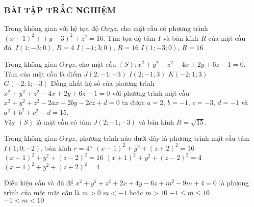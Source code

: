 \subsubsection{BÀI TẬP TRẮC NGHIỆM}
\begin{ex}%
	Trong không gian với hệ tọa độ $Oxyz$, cho mặt cầu có phương trình $(x+1)^2+(y-3)^2+z^2=16$. Tìm tọa độ tâm $I$ và bán kính $R$ của mặt cầu đó.
	{$I(1;-3;0)$, $R=4$}
	{$I(-1;3;0)$, $R=16$}
	{$I(1;-3;0)$, $R=16$}
\end{ex}
\begin{ex}%
	Trong không gian $Oxyz$, cho mặt cầu $(S)\colon x^2+y^2+z^2 -4x+2y+6z-1=0$. Tâm của mặt cầu là điểm
	\choice
	{\True $J(2;-1;-3)$}
	{$I(2;-1;3)$}
	{$K(-2;1;3)$}
	{$G(-2;1;-3)$}
	\loigiai
	{
		Đồng nhất hệ số của phương trình $x^2+y^2+z^2 -4x+2y+6z-1=0$ với phương trình mặt cầu $x^2+y^2+z^2 -2ax-2by-2cz+d=0$ ta được $a=2$, $b=-1$, $c=-3$, $d=-1$ và $a^2+b^2+c^2-d=15$.\\
		Vậy $(S)$ là mặt cầu có tâm $J(2;-1;-3)$ và bán kính $R=\sqrt{15}$.
	}
\end{ex}
\begin{ex}%
	Trong không gian $Oxyz$, phương trình nào dưới đây là phương trình mặt cầu tâm	$I(1;0;-2)$, bán kính $r=4$?
	\choice
	{\True $(x-1)^2 +y^2 + (z+2)^2 =16$}
	{$(x+1)^2 +y^2 + (z-2)^2 =16$}
	{$(x+1)^2 +y^2 + (z-2)^2 =4$}
	{$(x-1)^2 +y^2 + (z+2)^2 =4$}
\end{ex}
\begin{ex}%
	Điều kiện cần và đủ để $x^2+y^2+z^2+2x+4y-6z+m^2-9m+4=0$ là phương trình của một mặt cầu là
	\choice
	{$m>0$}
	{$m<-1$ hoặc $m>10$}
	{ $-1 \le m \le 10$}
	{\True $-1<m<10$}
\end{ex}

